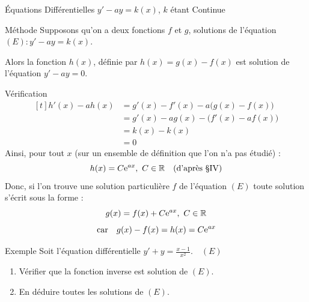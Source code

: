 \documentclass{coursbook}
\begin{document}
    \begin{Gpartie}{Équations Différentielles $y'-ay=k(x)$, $k$ étant Continue} 
        \vspace{-5ex}
        \begin{Spartie}{Méthode} 
            Supposons qu'on a deux fonctions $f$ et $g$, solutions de l'équation $(E): y'-ay=k(x)$.

            Alors la fonction $h(x)$, définie par $h(x)=g(x)-f(x)$ est solution de l'équation $y'-ay=0$.
            \begin{SSpartie}{Vérification} 
                \[\begin{aligned}[t]
                    h'(x)-ah(x)&=g'(x)-f'(x)-a\big(g(x)-f(x)\big) \\
                    &=g'(x)-ag(x)-\big(f'(x)-a f(x)\big) \\
                    &=k(x)-k(x) \\
                    &=0
                \end{aligned}\]
                Ainsi, pour tout $x$ (sur un ensemble de définition que l'on n’a pas étudié) :
                \[h(x)=C\me^{ax},~C\in\mathbb{R}\quad\text{(d'après \textsection IV)}\]
                Donc, si l'on trouve une solution particulière $f$ de l'équation $(E)$ toute solution s'écrit sous la forme :
                \[g(x)=f(x)+C\mathrm{e}^{ax},~C\in\mathbb{R}\]
                \[\text{car}\quad g(x)-f(x)=h(x)=C\mathrm{e}^{ax}\] 
            \end{SSpartie}
        \end{Spartie}
        \begin{Spartie}{Exemple} 
            Soit l'équation différentielle $y'+y=\frac{x-1}{x^2}$.$\quad(E)$
            \begin{enumerate}
                \item Vérifier que la fonction inverse est solution de $(E)$.
                \item En déduire toutes les solutions de $(E)$.
            \end{enumerate}


\end{Spartie}
\end{Gpartie}
\end{document}
